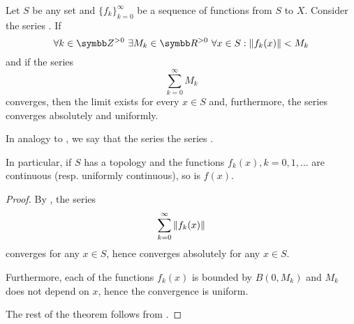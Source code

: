 \begin{corollary}\label{thm:weierstrass_series_criterion}\cite[]{Фихтенгольц1968/2}
  Let \( S \) be any set and \( \{ f_k \}_{k=0}^\infty \) be a sequence of functions from \( S \) to \( X \). Consider the series . If
  \begin{equation*}
    \forall k \in \BZ^{>0} \ \exists M_k \in \BR^{>0} \ \forall x \in S : \Norm{f_k(x)} < M_k
  \end{equation*}
  and if the series
  \begin{equation}\label{thm:weierstrass_series_criterion/dominating}
    \sum_{k=0}^\infty M_k
  \end{equation}
  converges, then the limit  exists for every \( x \in S \) and, furthermore, the series converges absolutely and uniformly.

  In analogy to , we say that the series   the series .

  In particular, if \( S \) has a topology and the functions \( f_k(x), k = 0, 1, \ldots \) are continuous (resp. uniformly continuous), so is \( f(x) \).
\end{corollary}
\begin{proof}
  By , the series
  \begin{equation*}
    \sum_{k=0}^\infty \left\Vert f_k(x) \right\Vert
  \end{equation*}
  converges for any \( x \in S \), hence  converges absolutely for any \( x \in S \).

  Furthermore, each of the functions \( f_k(x) \) is bounded by \( B(0, M_k) \) and \( M_k \) does not depend on \( x \), hence the convergence is uniform.

  The rest of the theorem follows from .
\end{proof}

